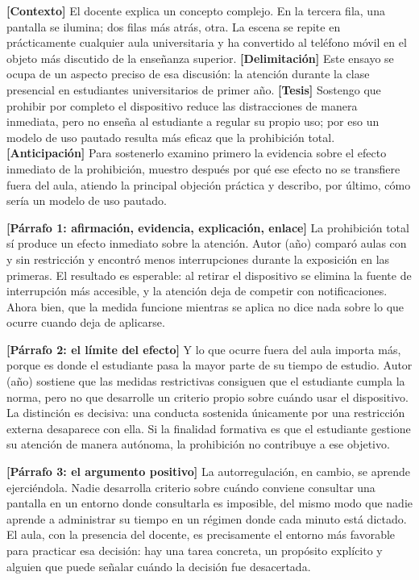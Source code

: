 \documentclass[12pt,a4paper,openany]{report}
\begin{document}
\vspace{8pt}
\textcolor{grismedio}{\small\textbf{[Contexto]}} El docente explica un concepto complejo. En la tercera fila, una pantalla se ilumina; dos filas m\'as atr\'as, otra. La escena se repite en pr\'acticamente cualquier aula universitaria y ha convertido al tel\'efono m\'ovil en el objeto m\'as discutido de la ense\~nanza superior. \textcolor{grismedio}{\small\textbf{[Delimitaci\'on]}} Este ensayo se ocupa de un aspecto preciso de esa discusi\'on: la atenci\'on durante la clase presencial en estudiantes universitarios de primer a\~no. \textcolor{grismedio}{\small\textbf{[Tesis]}} Sostengo que prohibir por completo el dispositivo reduce las distracciones de manera inmediata, pero no ense\~na al estudiante a regular su propio uso; por eso un modelo de uso pautado resulta m\'as eficaz que la prohibici\'on total. \textcolor{grismedio}{\small\textbf{[Anticipaci\'on]}} Para sostenerlo examino primero la evidencia sobre el efecto inmediato de la prohibici\'on, muestro despu\'es por qu\'e ese efecto no se transfiere fuera del aula, atiendo la principal objeci\'on pr\'actica y describo, por \'ultimo, c\'omo ser\'ia un modelo de uso pautado.

\textcolor{grismedio}{\small\textbf{[P\'arrafo 1: afirmaci\'on, evidencia, explicaci\'on, enlace]}} La prohibici\'on total s\'i produce un efecto inmediato sobre la atenci\'on. Autor (a\~no) compar\'o aulas con y sin restricci\'on y encontr\'o menos interrupciones durante la exposici\'on en las primeras. El resultado es esperable: al retirar el dispositivo se elimina la fuente de interrupci\'on m\'as accesible, y la atenci\'on deja de competir con notificaciones. Ahora bien, que la medida funcione mientras se aplica no dice nada sobre lo que ocurre cuando deja de aplicarse.

\textcolor{grismedio}{\small\textbf{[P\'arrafo 2: el l\'imite del efecto]}} Y lo que ocurre fuera del aula importa m\'as, porque es donde el estudiante pasa la mayor parte de su tiempo de estudio. Autor (a\~no) sostiene que las medidas restrictivas consiguen que el estudiante cumpla la norma, pero no que desarrolle un criterio propio sobre cu\'ando usar el dispositivo. La distinci\'on es decisiva: una conducta sostenida \'unicamente por una restricci\'on externa desaparece con ella. Si la finalidad formativa es que el estudiante gestione su atenci\'on de manera aut\'onoma, la prohibici\'on no contribuye a ese objetivo.

\textcolor{grismedio}{\small\textbf{[P\'arrafo 3: el argumento positivo]}} La autorregulaci\'on, en cambio, se aprende ejerci\'endola. Nadie desarrolla criterio sobre cu\'ando conviene consultar una pantalla en un entorno donde consultarla es imposible, del mismo modo que nadie aprende a administrar su tiempo en un r\'egimen donde cada minuto est\'a dictado. El aula, con la presencia del docente, es precisamente el entorno m\'as favorable para practicar esa decisi\'on: hay una tarea concreta, un prop\'osito expl\'icito y alguien que puede se\~nalar cu\'ando la decisi\'on fue desacertada.
\end{document}
